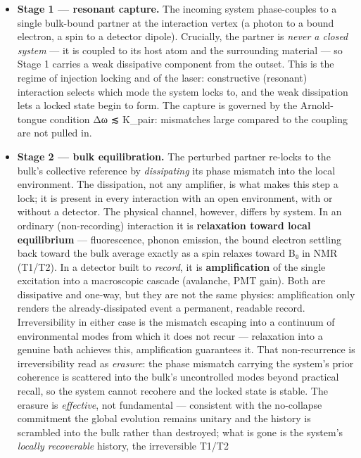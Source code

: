 \documentclass[
]{article}
\providecommand{\tightlist}{%
  \setlength{\itemsep}{0pt}\setlength{\parskip}{0pt}}
\begin{document}
\begin{itemize}
\tightlist
\item
  \textbf{Stage 1 --- resonant capture.} The incoming system
  phase-couples to a single bulk-bound partner at the interaction vertex
  (a photon to a bound electron, a spin to a detector dipole).
  Crucially, the partner is \emph{never a closed system} --- it is
  coupled to its host atom and the surrounding material --- so Stage 1
  carries a weak dissipative component from the outset. This is the
  regime of injection locking and of the laser: constructive (resonant)
  interaction selects which mode the system locks to, and the weak
  dissipation lets a locked state begin to form. The capture is governed
  by the Arnold-tongue condition \textbar Δω\textbar{} ≲ K\_pair:
  mismatches large compared to the coupling are not pulled in.
\item
  \textbf{Stage 2 --- bulk equilibration.} The perturbed partner
  re-locks to the bulk's collective reference by \emph{dissipating} its
  phase mismatch into the local environment. The dissipation, not any
  amplifier, is what makes this step a lock; it is present in every
  interaction with an open environment, with or without a detector. The
  physical channel, however, differs by system. In an ordinary
  (non-recording) interaction it is \textbf{relaxation toward local
  equilibrium} --- fluorescence, phonon emission, the bound electron
  settling back toward the bulk average exactly as a spin relaxes toward
  B₀ in NMR (T1/T2). In a detector built to \emph{record}, it is
  \textbf{amplification} of the single excitation into a macroscopic
  cascade (avalanche, PMT gain). Both are dissipative and one-way, but
  they are not the same physics: amplification only renders the
  already-dissipated event a permanent, readable record. Irreversibility
  in either case is the mismatch escaping into a continuum of
  environmental modes from which it does not recur --- relaxation into a
  genuine bath achieves this, amplification guarantees it. That
  non-recurrence is irreversibility read as \emph{erasure}: the phase
  mismatch carrying the system's prior coherence is scattered into the
  bulk's uncontrolled modes beyond practical recall, so the system
  cannot recohere and the locked state is stable. The erasure is
  \emph{effective}, not fundamental --- consistent with the no-collapse
  commitment the global evolution remains unitary and the history is
  scrambled into the bulk rather than destroyed; what is gone is the
  system's \emph{locally recoverable} history, the irreversible T1/T2

\end{itemize}
\end{document}
